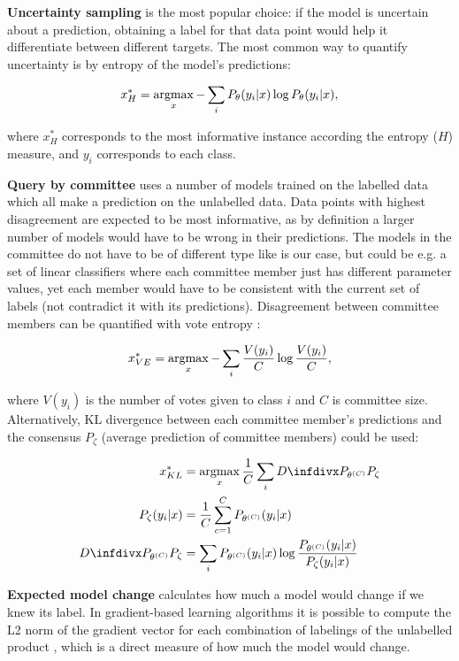 \textbf{Uncertainty sampling} is the most popular choice: if the model is uncertain about a prediction, obtaining a label for that data point would help it differentiate between different targets.
The most common way to quantify uncertainty is by entropy of the model's predictions:

\begin{equation}
 x^*_H = \operatorname*{argmax}_x - \sum_{i} P_\theta(y_i|x) \log P_\theta(y_i|x),
\end{equation}

where $x^*_H$ corresponds to the most informative instance according the entropy ($H$) measure, and $y_i$ corresponds to each class.

\textbf{Query by committee} uses a number of models trained on the labelled data which all make a prediction on the unlabelled data.
Data points with highest disagreement are expected to be most informative, as by definition a larger number of models would have to be wrong in their predictions.
The models in the committee do not have to be of different type like is our case, but could be e.g. a set of linear classifiers where each committee member just has different parameter values, yet each member would have to be consistent with the current set of labels (not contradict it with its predictions).
Disagreement between committee members can be quantified with vote entropy \cite{vote_entropy}:

\begin{equation}
 x^*_{VE} = \operatorname*{argmax}_x - \sum_{i} \frac{V(y_i)}{C}  \log \frac{V(y_i)}{C},
\end{equation}

where $V(y_i)$ is the number of votes given to class $i$ and $C$ is committee size.
Alternatively, KL divergence between each committee member's predictions and the consensus $P_\zeta$ (average prediction of committee members) could be used:

\begin{align}
 x^*_{KL} &= \argmax_x \frac{1}{C} \sum_{i} \infdiv{P_{\theta^{(C)}}}{P_\zeta}\\
 P_\zeta(y_i | x) &= \frac{1}{C} \sum_{c=1}^C P_{\theta^{(C)}}(y_i|x)\\
 \infdiv{P_{\theta^{(C)}}}{P_\zeta} &= \sum_i  P_{\theta^{(C)}}(y_i|x) \log \frac{ P_{\theta^{(C)}}(y_i|x) }{ P_{\zeta}(y_i|x) }
\end{align}

\textbf{Expected model change} calculates how much a model would change if we knew its label.
In gradient-based learning algorithms it is possible to compute the L2 norm of the gradient vector for each combination of labelings of the unlabelled product \cite{model_change}, which is a direct measure of how much the model would change.

